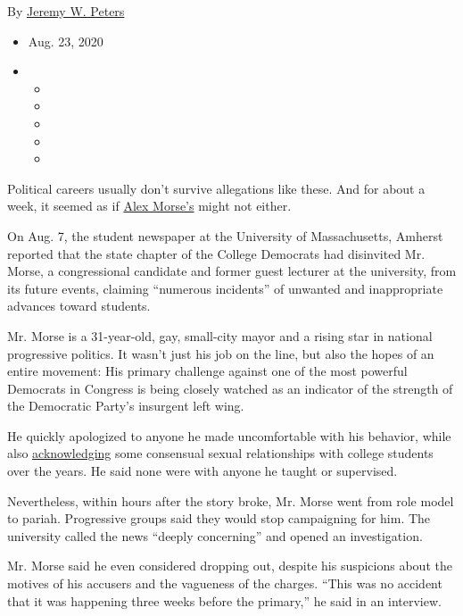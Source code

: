 By \href{https://www.nytimes3xbfgragh.onion/by/jeremy-w-peters}{Jeremy
W. Peters}

\begin{itemize}
\item
  Aug. 23, 2020
\item
  \begin{itemize}
  \item
  \item
  \item
  \item
  \item
  \end{itemize}
\end{itemize}

Political careers usually don't survive allegations like these. And for
about a week, it seemed as if
\href{https://www.nytimes3xbfgragh.onion/2020/08/25/us/politics/alex-morse-richard-neal-aoc.html}{Alex
Morse's} might not either.

On Aug. 7, the student newspaper at the University of Massachusetts,
Amherst reported that the state chapter of the College Democrats had
disinvited Mr. Morse, a congressional candidate and former guest
lecturer at the university, from its future events, claiming ``numerous
incidents'' of unwanted and inappropriate advances toward students.

Mr. Morse is a 31-year-old, gay, small-city mayor and a rising star in
national progressive politics. It wasn't just his job on the line, but
also the hopes of an entire movement: His primary challenge against one
of the most powerful Democrats in Congress is being closely watched as
an indicator of the strength of the Democratic Party's insurgent left
wing.

He quickly apologized to anyone he made uncomfortable with his behavior,
while also
\href{https://twitter.com/AlexBMorse/status/1292634553669091329/photo/1}{acknowledging}
some consensual sexual relationships with college students over the
years. He said none were with anyone he taught or supervised.

Nevertheless, within hours after the story broke, Mr. Morse went from
role model to pariah. Progressive groups said they would stop
campaigning for him. The university called the news ``deeply
concerning'' and opened an investigation.

Mr. Morse said he even considered dropping out, despite his suspicions
about the motives of his accusers and the vagueness of the charges.
``This was no accident that it was happening three weeks before the
primary,'' he said in an interview.

